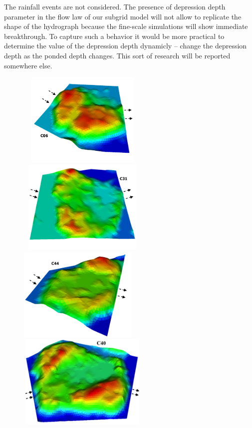 \documentclass[review,11pt]{elsarticle}
\begin{document}
The rainfall events are not considered. The presence of depression depth parameter in the flow law of our subgrid model will not allow to replicate the shape of the hydrograph because the fine-scale simulations will show immediate breakthrough. To capture such a behavior it would be more practical to determine the value of the depression depth dynamicly -- change the depression depth as the ponded depth changes. This sort of research will be reported somewhere else.

\begin{figure}[!htb]
\centering
\vskip -1cm
\includegraphics[width=6.2cm, height=4.5cm]{./figures/polygons-finescale/3Dpolygon06-3B.png}
\includegraphics[width=6.2cm, height=4.5cm]{./figures/polygons-finescale/3Dpolygon31-3B.png}\\
\includegraphics[width=6.cm, height=4.5cm]{./figures/polygons-finescale/3Dpolygon44-3B.png}
\includegraphics[width=6.2cm, height=4.5cm]{./figures/polygons-finescale/3Dpolygon40-1.png} \\

\end{figure}
\end{document}
